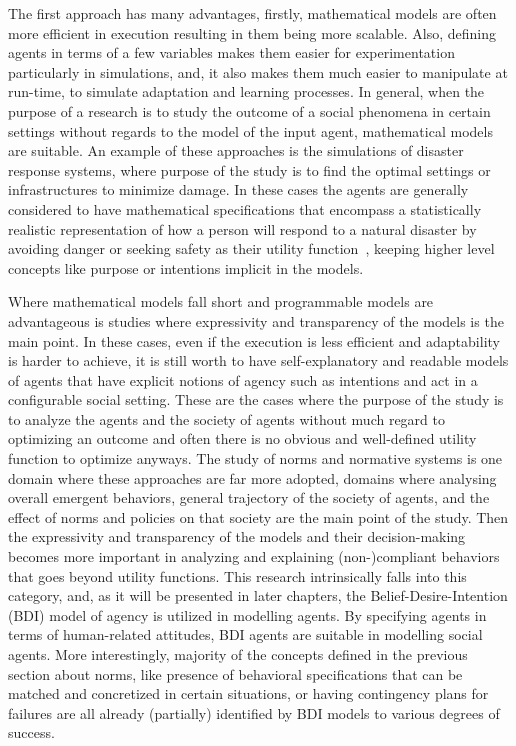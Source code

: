 The first approach has many advantages, firstly, mathematical models are often more efficient in execution resulting in them being more scalable. Also, defining agents in terms of a few variables makes them easier for experimentation particularly in simulations, and, it also makes them much easier to manipulate at run-time, to simulate adaptation and learning processes. In general, when the purpose of a research is to study the outcome of a social phenomena in certain settings without regards to the model of the input agent, mathematical models are suitable. An example of these approaches is the simulations of disaster response systems, where purpose of the study is to find the optimal settings or infrastructures to minimize damage. In these cases the agents are generally considered to have mathematical specifications that encompass a statistically realistic representation of how a person will respond to a natural disaster by avoiding danger or seeking safety as their utility function~\cite{Something}, keeping higher level concepts like purpose or intentions implicit in the models.


Where mathematical models fall short and programmable models are advantageous is studies where expressivity and transparency of the models is the main point. In these cases, even if the execution is less efficient and adaptability is harder to achieve, it is still worth to have self-explanatory and readable models of agents that have explicit notions of agency such as intentions and act in a configurable social setting. These are the cases where the purpose of the study is to analyze the agents and the society of agents without much regard to optimizing an outcome and often there is no obvious and well-defined utility function to optimize anyways. The study of norms and normative systems is one domain where these approaches are far more adopted, domains where analysing overall emergent behaviors, general trajectory of the society of agents, and the effect of norms and policies on that society are the main point of the study. Then the expressivity and transparency of the models and their decision-making becomes more important in analyzing and explaining (non-)compliant behaviors that goes beyond utility functions. This research intrinsically falls into this category, and, as it will be presented in later chapters, the Belief-Desire-Intention (BDI) model of agency \cite{Something} is utilized in modelling agents. By specifying agents in terms of human-related attitudes, BDI agents are suitable in modelling social agents. More interestingly, majority of the concepts defined in the previous section about norms, like presence of behavioral specifications that can be matched and concretized in certain situations, or having contingency plans for failures are all already (partially) identified by BDI models to various degrees of success.


